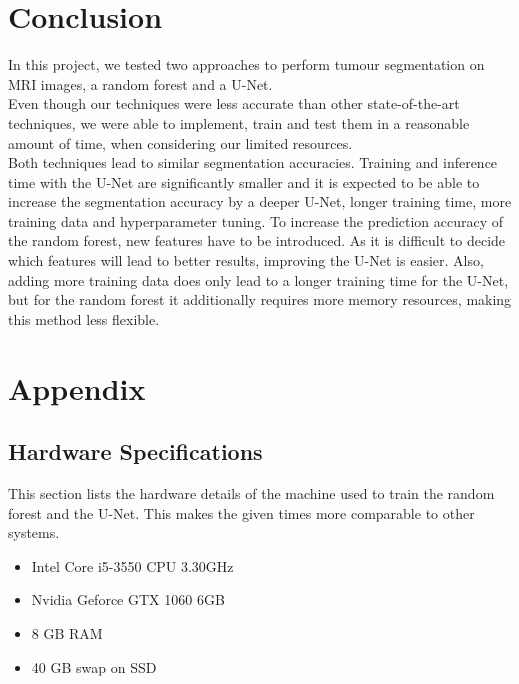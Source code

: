 \documentclass[final]{article}
\begin{document}
\section{Conclusion}
In this project, we tested two approaches to perform tumour segmentation on MRI images, a random forest and a U-Net. \\ 
Even though our techniques were less accurate than other state-of-the-art techniques, we were able to implement, train and test them in a reasonable amount of time, when considering our limited resources. \\
Both techniques lead to similar segmentation accuracies. Training and inference
time with the U-Net are significantly smaller and it is expected to be able to
increase the segmentation accuracy by a deeper U-Net, longer training time,
more training data and hyperparameter tuning. To increase the prediction
accuracy of the random forest, new features have to be introduced. As it is
difficult to decide which features will lead to better results, improving the
U-Net is easier. Also, adding more training data does only lead to a longer
training time for the U-Net, but for the random forest it additionally requires
more memory resources, making this method less flexible.
\newpage
\section{Appendix}

\subsection{Hardware Specifications}
This section lists the hardware details of the machine used to train the random
forest and the U-Net. This makes the given times more comparable to other
systems.
\begin{itemize}
\item Intel Core i5-3550 CPU \@ 3.30GHz
\item Nvidia Geforce GTX 1060 6GB
\item 8 GB RAM
\item 40 GB swap on SSD
\end{itemize}

\clearpage
\end{document}
